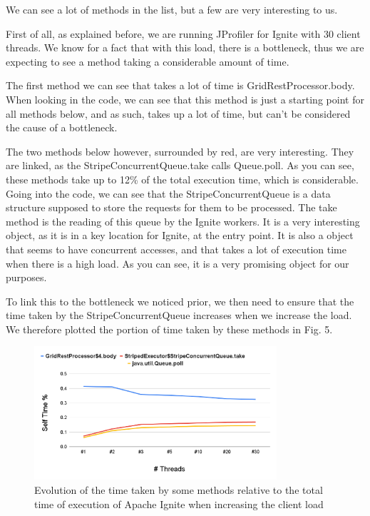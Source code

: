 \documentclass[conference]{IEEEtran}
\begin{document}
We can see a lot of methods in the list, but a few are very interesting to us.

First of all, as explained before, we are running JProfiler for Ignite with 30 client threads. We know for a fact that with this load, there is a bottleneck, thus we are expecting to see a method taking a considerable amount of time.

The first method we can see that takes a lot of time is GridRestProcessor.body. When looking in the code, we can see that this method is just a starting point for all methods below, and as such, takes up a lot of time, but can't be considered the cause of a bottleneck.

The two methods below however, surrounded by red, are very interesting. They are linked, as the StripeConcurrentQueue.take calls Queue.poll. As you can see, these methods take up to 12\% of the total execution time, which is considerable. Going into the code, we can see that the StripeConcurrentQueue is a data structure supposed to store the requests for them to be processed. The take method is the reading of this queue by the Ignite workers. It is a very interesting object, as it is in a key location for Ignite, at the entry point. It is also a object that seems to have concurrent accesses, and that takes a lot of execution time when there is a high load. As you can see, it is a very promising object for our purposes.

To link this to the bottleneck we noticed prior, we then need to ensure that the time taken by the StripeConcurrentQueue increases when we increase the load. We therefore plotted the portion of time taken by these methods in Fig. 5.

\begin{figure}[!ht]
\centerline{\includegraphics[width=90mm]{selftime.png}}
\caption{Evolution of the time taken by some methods relative to the total time of execution of Apache Ignite when increasing the client load}
\label{selftime}
\end{figure}
\end{document}
